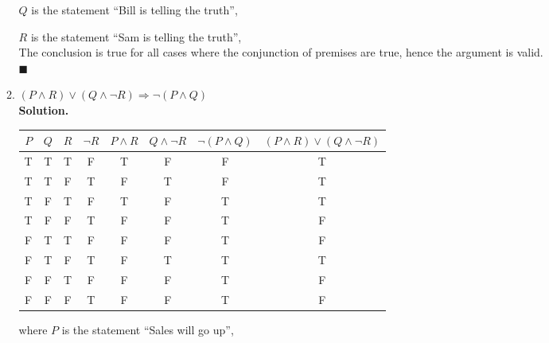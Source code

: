 \documentclass{report}
\newcommand{\sol}{\vspace{1em}\\\textbf{Solution.}\vspace{0.5em}}
\newcommand{\qed}{‎\\‎\hfill$\blacksquare$\vspace{1em}}
\begin{document}
\begin{enumerate}[leftmargin=*]
\begin{enumerate}
                    $Q$ is the statement ``Bill is telling the truth'',

                    $R$ is the statement ``Sam is telling the truth'',\\

                    The conclusion is true for all cases where the conjunction of premises are
                    true, hence the argument is valid.\qed

              \item $(P \wedge R) \vee (Q \wedge \neg R)
                        \Rightarrow \neg(P \wedge Q)$
                    \sol{}
                    \begin{center}
                        \begin{tabular}{cccccccc}
                            $P$ & $Q$ & $R$ & $\neg R$ & $P \wedge R$ & $Q \wedge \neg R$ & $\neg(P \wedge Q)$ & $(P \wedge R) \vee (Q \wedge \neg R)$ \\
                            \hline
                            T   & T   & T   & F        & T            & F                 & F                  & T                                     \\
                            T   & T   & F   & T        & F            & T                 & F                  & T                                     \\
                            T   & F   & T   & F        & T            & F                 & T                  & T                                     \\
                            T   & F   & F   & T        & F            & F                 & T                  & F                                     \\
                            F   & T   & T   & F        & F            & F                 & T                  & F                                     \\
                            F   & T   & F   & T        & F            & T                 & T                  & T                                     \\
                            F   & F   & T   & F        & F            & F                 & T                  & F                                     \\
                            F   & F   & F   & T        & F            & F                 & T                  & F
                        \end{tabular}
                    \end{center}
                    where $P$ is the statement ``Sales will go up'',


\end{enumerate}
\end{enumerate}
\end{document}
